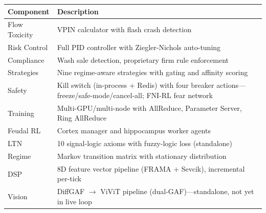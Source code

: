 \documentclass[12pt, a4paper]{article}
\begin{document}
\begin{table}[H]
	\centering
	\small
	\begin{tabularx}{\textwidth}{|l|L|}
		\hline
		\textbf{Component} & \textbf{Description}                                                                                                    \\
		\hline
		Flow Toxicity      & VPIN calculator with flash crash detection                                                                              \\
		\hline
		Risk Control       & Full PID controller with Ziegler-Nichols auto-tuning                                                                    \\
		\hline
		Compliance         & Wash sale detection, proprietary firm rule enforcement                                                                  \\
		\hline
		Strategies         & Nine regime-aware strategies with gating and affinity scoring                                                           \\
		\hline
		Safety             & Kill switch (in-process + Redis) with four breaker actions---freeze/safe-mode/cancel-all; FNI-RL fear network                                                                             \\
		\hline
		Training           & Multi-GPU/multi-node with AllReduce, Parameter Server, Ring AllReduce                                                   \\
		\hline
		Feudal RL          & Cortex manager and hippocampus worker agents                                                                            \\
		\hline
		LTN                & 10 signal-logic axioms with fuzzy-logic loss (standalone)                                                                   \\
		\hline
		Regime             & Markov transition matrix with stationary distribution                                                                   \\
		\hline
		DSP                & 8D feature vector pipeline (FRAMA + Sevcik), incremental per-tick                                                                 \\
		\hline
		Vision             & DiffGAF $\rightarrow$ ViViT pipeline (dual-GAF)---standalone, not yet in live loop                                                           \\
		\hline

\end{tabularx}
\end{table}
\end{document}
